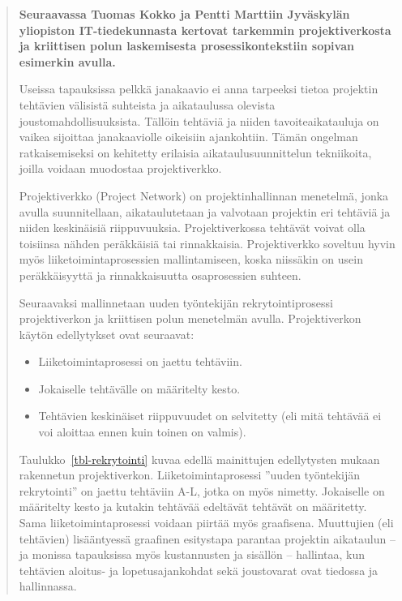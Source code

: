 \documentclass[
  finnish,
  letterpaper,
  DIV=11,
  numbers=noendperiod,
  oneside]{scrreprt}
\providecommand{\tightlist}{%
  \setlength{\itemsep}{0pt}\setlength{\parskip}{0pt}}
\begin{document}
\begin{quote}
\textbf{Seuraavassa Tuomas Kokko ja Pentti Marttiin Jyväskylän
yliopiston IT-tiedekunnasta kertovat tarkemmin projektiverkosta ja
kriittisen polun laskemisesta prosessikontekstiin sopivan esimerkin
avulla.}

Useissa tapauksissa pelkkä janakaavio ei anna tarpeeksi tietoa projektin
tehtävien välisistä suhteista ja aikataulussa olevista
joustomahdollisuuksista. Tällöin tehtäviä ja niiden tavoiteaikatauluja
on vaikea sijoittaa janakaaviolle oikeisiin ajankohtiin. Tämän ongelman
ratkaisemiseksi on kehitetty erilaisia aikataulusuunnittelun
tekniikoita, joilla voidaan muodostaa projektiverkko.

Projektiverkko (Project Network) on projektinhallinnan menetelmä, jonka
avulla suunnitellaan, aikataulutetaan ja valvotaan projektin eri
tehtäviä ja niiden keskinäisiä riippuvuuksia. Projektiverkossa tehtävät
voivat olla toisiinsa nähden peräkkäisiä tai rinnakkaisia.
Projektiverkko soveltuu hyvin myös liiketoimintaprosessien
mallintamiseen, koska niissäkin on usein peräkkäisyyttä ja
rinnakkaisuutta osaprosessien suhteen.

Seuraavaksi mallinnetaan uuden työntekijän rekrytointiprosessi
projektiverkon ja kriittisen polun menetelmän avulla. Projektiverkon
käytön edellytykset ovat seuraavat:

\begin{itemize}
\tightlist
\item
  Liiketoimintaprosessi on jaettu tehtäviin.
\item
  Jokaiselle tehtävälle on määritelty kesto.
\item
  Tehtävien keskinäiset riippuvuudet on selvitetty (eli mitä tehtävää ei
  voi aloittaa ennen kuin toinen on valmis).
\end{itemize}

Taulukko~\ref{tbl-rekrytointi} kuvaa edellä mainittujen edellytysten
mukaan rakennetun projektiverkon. Liiketoimintaprosessi ''uuden
työntekijän rekrytointi'' on jaettu tehtäviin A-L, jotka on myös
nimetty. Jokaiselle on määritelty kesto ja kutakin tehtävää edeltävät
tehtävät on määritetty. Sama liiketoimintaprosessi voidaan piirtää myös
graafisena. Muuttujien (eli tehtävien) lisääntyessä graafinen esitystapa
parantaa projektin aikataulun -- ja monissa tapauksissa myös
kustannusten ja sisällön -- hallintaa, kun tehtävien aloitus- ja
lopetusajankohdat sekä joustovarat ovat tiedossa ja hallinnassa.
\end{quote}
\end{document}
